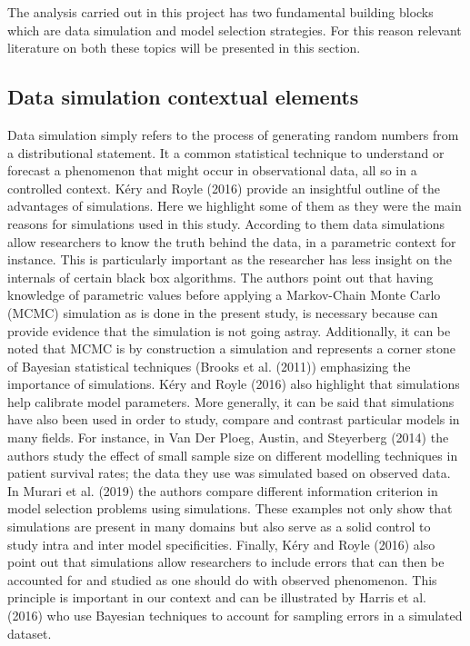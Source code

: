 \documentclass[]{article}
\begin{document}
The analysis carried out in this project has two fundamental building
blocks which are data simulation and model selection strategies. For
this reason relevant literature on both these topics will be presented
in this section.

\hypertarget{data-simulation-contextual-elements}{%
\subsection{Data simulation contextual
elements}\label{data-simulation-contextual-elements}}

Data simulation simply refers to the process of generating random
numbers from a distributional statement. It a common statistical
technique to understand or forecast a phenomenon that might occur in
observational data, all so in a controlled context. Kéry and Royle
(2016) provide an insightful outline of the advantages of simulations.
Here we highlight some of them as they were the main reasons for
simulations used in this study. According to them data simulations allow
researchers to know the truth behind the data, in a parametric context
for instance. This is particularly important as the researcher has less
insight on the internals of certain black box algorithms. The authors
point out that having knowledge of parametric values before applying a
Markov-Chain Monte Carlo (MCMC) simulation as is done in the present
study, is necessary because can provide evidence that the simulation is
not going astray. Additionally, it can be noted that MCMC is by
construction a simulation and represents a corner stone of Bayesian
statistical techniques (Brooks et al. (2011)) emphasizing the importance
of simulations. Kéry and Royle (2016) also highlight that simulations
help calibrate model parameters. More generally, it can be said that
simulations have also been used in order to study, compare and contrast
particular models in many fields. For instance, in Van Der Ploeg,
Austin, and Steyerberg (2014) the authors study the effect of small
sample size on different modelling techniques in patient survival rates;
the data they use was simulated based on observed data. In Murari et al.
(2019) the authors compare different information criterion in model
selection problems using simulations. These examples not only show that
simulations are present in many domains but also serve as a solid
control to study intra and inter model specificities. Finally, Kéry and
Royle (2016) also point out that simulations allow researchers to
include errors that can then be accounted for and studied as one should
do with observed phenomenon. This principle is important in our context
and can be illustrated by Harris et al. (2016) who use Bayesian
techniques to account for sampling errors in a simulated dataset.
\end{document}
